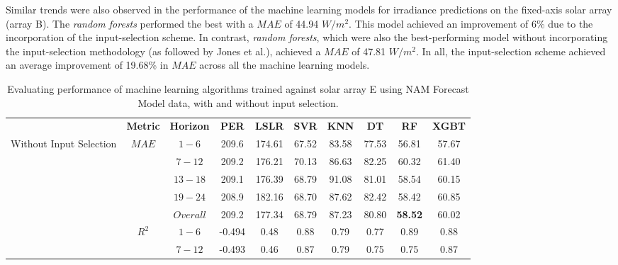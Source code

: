 \par Similar trends were also observed in the performance of the machine learning models for irradiance predictions on the fixed-axis solar array (array B). The \textit{random forests} performed the best with a $MAE$ of 44.94 $W/m^2$. This model achieved an improvement of 6\% due to the incorporation of the input-selection scheme. In contrast, \textit{random forests}, which were also the best-performing model without incorporating the input-selection methodology (as followed by Jones et al.), achieved a $MAE$ of 47.81 $W/m^2$. In all, the input-selection scheme achieved an average improvement of 19.68\% in $MAE$ across all the machine learning models.

\begin{table}[h]
\begin{center}
    \label{Tab:fs_array_e}
    \caption{Evaluating performance of machine learning algorithms trained against solar array E using NAM Forecast Model data, with and without input selection.}
    \vspace{0.2cm}
    \begin{tabular}{@{}p{5.3em}ccccccccc@{}}
    \toprule
    & \textbf{Metric} & \textbf{Horizon} & \textbf{PER} & \textbf{LSLR} & \textbf{SVR} & \textbf{KNN} & \textbf{DT} & \textbf{RF} & \textbf{XGBT} \\ \cmidrule(l){1-10} 
    \multirow{10}{5em}{Without Input Selection} & \multirow{5}{*}{$MAE$} & $1 - 6$ & 209.6 & 174.61 & 67.52 & 83.58 & 77.53 & 56.81 & 57.67 \\
                                              &                   & $7 - 12$ & 209.2 & 176.21 & 70.13 & 86.63 & 82.25 & 60.32 & 61.40 \\
                                              &                   & $13 - 18$ & 209.1 & 176.39 & 68.79 & 91.08 & 81.01 & 58.54 & 60.15 \\
                                              &                   & $19 - 24$ & 208.9 & 182.16 & 68.70 & 87.62 & 82.42 & 58.42 & 60.85 \\
                                              &                   & $Overall$ & 209.2 & 177.34 & 68.79 & 87.23 & 80.80 & \textbf{58.52} & 60.02 \\ \cmidrule(lr){2-10}
                                              & \multirow{5}{*}{$R^2$} & $1 - 6$ & -0.494 & 0.48 & 0.88 & 0.79 & 0.77 & 0.89 & 0.88 \\
                                              &                   & $7 - 12$ & -0.493 & 0.46 & 0.87 & 0.79 & 0.75 & 0.75 & 0.87 \\

\end{tabular}
\end{center}
\end{table}
